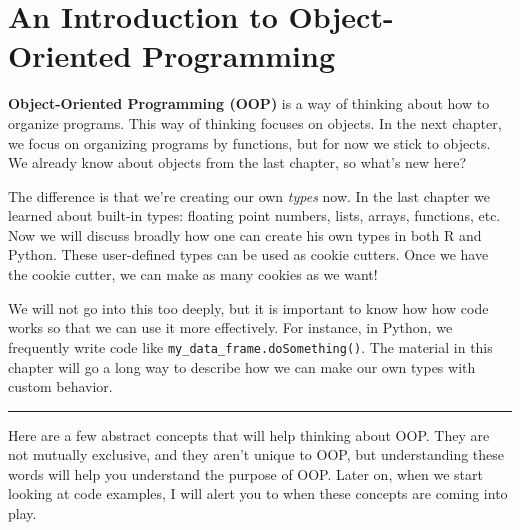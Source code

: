 \documentclass[
  12pt,
  krantz2]{krantz}
\begin{document}
\hypertarget{an-introduction-to-object-oriented-programming}{%
\chapter{An Introduction to Object-Oriented Programming}\label{an-introduction-to-object-oriented-programming}}

\textbf{Object-Oriented Programming (OOP)} is a way of thinking about how to organize programs. This way of thinking focuses on objects. In the next chapter, we focus on organizing programs by functions, but for now we stick to objects. We already know about objects from the last chapter, so what's new here?

The difference is that we're creating our own \emph{types} now. In the last chapter we learned about built-in types: floating point numbers, lists, arrays, functions, etc. Now we will discuss broadly how one can create his own types in both R and Python. These user-defined types can be used as cookie cutters. Once we have the cookie cutter, we can make as many cookies as we want!

We will not go into this too deeply, but it is important to know how how code works so that we can use it more effectively. For instance, in Python, we frequently write code like \texttt{my\_data\_frame.doSomething()}. The material in this chapter will go a long way to describe how we can make our own types with custom behavior.

\begin{center}\rule{0.5\linewidth}{0.5pt}\end{center}

Here are a few abstract concepts that will help thinking about OOP. They are not mutually exclusive, and they aren't unique to OOP, but understanding these words will help you understand the purpose of OOP. Later on, when we start looking at code examples, I will alert you to when these concepts are coming into play.
\end{document}
